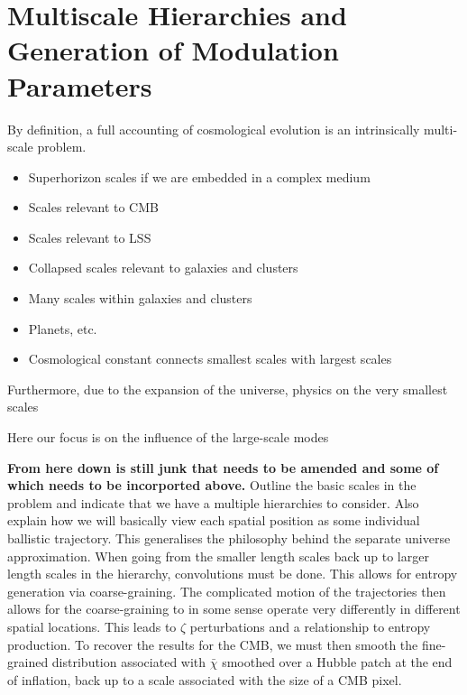 \section{Multiscale Hierarchies and Generation of Modulation Parameters}
By definition, a full accounting of cosmological evolution is an intrinsically multi-scale problem.
\begin{itemize}
\item Superhorizon scales if we are embedded in a complex medium
\item Scales relevant to CMB
\item Scales relevant to LSS
\item Collapsed scales relevant to galaxies and clusters
\item Many scales within galaxies and clusters
\item Planets, etc.
\item Cosmological constant connects smallest scales with largest scales
\end{itemize}
Furthermore, due to the expansion of the universe, physics on the very smallest scales

Here our focus is on the influence of the large-scale modes

{\bf From here down is still junk that needs to be amended and some of which needs to be incorported above.}
Outline the basic scales in the problem and indicate that we have a multiple hierarchies to consider.  Also explain how we will basically view each spatial position as some individual ballistic trajectory.  This generalises the philosophy behind the separate universe approximation.  When going from the smaller length scales back up to larger length scales in the hierarchy, convolutions must be done.  This allows for entropy generation via coarse-graining.  The complicated motion of the trajectories then allows for the coarse-graining to in some sense operate very differently in different spatial locations.  This leads to $\zeta$ perturbations and a relationship to entropy production.  To recover the results for the CMB, we must then smooth the fine-grained distribution associated with $\bar{\chi}$ smoothed over a Hubble patch at the end of inflation, back up to a scale associated with the size of a CMB pixel.

